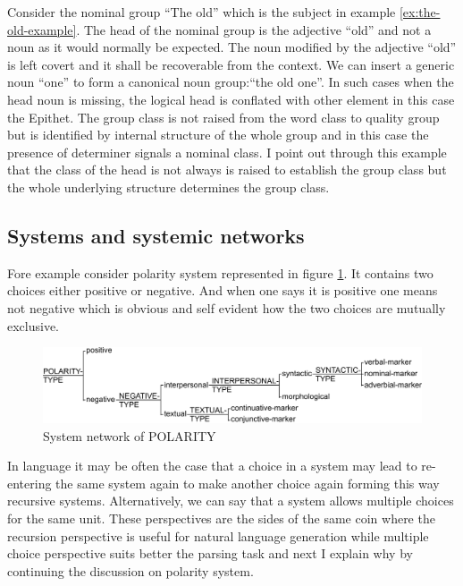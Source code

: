 Consider the nominal group ``The old'' which is the subject in example \ref{ex:the-old-example}. The head of the nominal group is the adjective ``old'' and not a noun as it would normally be expected. The noun modified by the adjective ``old'' is left covert and it shall be recoverable from the context. We can insert a generic noun ``one'' to form a canonical noun group:``the old one''. In such cases when the head noun is missing, the logical head is conflated with other element in this case the Epithet. The group class is not raised from the word class to quality group but is identified by internal structure  of the whole group and in this case the presence of determiner signals a nominal class. I point out through this example that the class of the head is not always is raised to establish the group class but the whole underlying structure determines the group class.

\subsection{Systems and systemic networks}

Fore example consider polarity system represented in figure \ref{fig:polarity}. It contains two choices either positive or negative. And when one says it is positive one means not negative which is obvious and self evident how the two choices are mutually exclusive.

\begin{figure}[H]
	\centering
	\includegraphics[width=\textwidth]{Figures/SFL-grammar/polarity-system.pdf}
	\caption{System network of POLARITY}
	\label{fig:polarity}
\end{figure}

In language it may be often the case that a choice in a system may lead to re-entering the same system again to make another choice again forming this way recursive systems. Alternatively, we can say that a system allows multiple choices for the same unit. These perspectives are the sides of the same coin where the recursion perspective is useful for natural language generation while multiple choice perspective suits better the parsing task and next I explain why by continuing the discussion on polarity system. 

